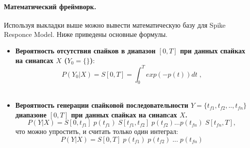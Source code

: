 \documentclass[a4paper,10pt]{article}
\begin{document}
\paragraph*{Математический фреймворк.} Используя выкладки выше можно вывести математическую базу для Spike Responce Model. Ниже приведены основные формулы.
\begin{itemize}
\item \textbf{Вероятность отсутствия спайков в диапазон $[0,T]$ при данных спайках на синапсах $X$ ($Y_{0} = \{\} $)}:
\begin{equation}\label{eq:p_y}
P(Y_{0}|X) = S[0,T] = \int_{0}^{T} exp(-p(t))dt\;,
\end{equation}
\\
\item \textbf{Вероятность генерации спайковой последовательности $Y = \{t_{f1},t_{f2},..,t_{fn}\}$ диапазоне $[0,T]$ при данных спайках на синапcах $X$.}
\begin{equation}\label{eq:p_y_complex}
P(Y|X)= S[0,t_{f1}]\; p(t_{f1})\;S[t_{f1},t_{f2}]\;p(t_{f2})...p(t_{fn}) \; S[t_{fn},T],
\end{equation}
что можно упростить, и считать только один интеграл:
\begin{equation}\label{eq:p_y}
P(Y|X)= S[0,T]\; p(t_{f1})\;p(t_{f2})\;...\;p(t_{fn})
\end{equation}
\end{itemize}
\end{document}
